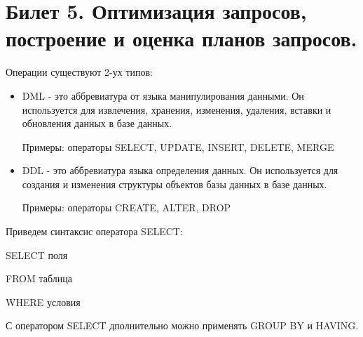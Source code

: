 \newpage
\section {Билет 5. Оптимизация запросов, построение и оценка планов запросов.}

Операции существуют 2-ух типов: 
\begin{itemize}
    \item DML - это аббревиатура от языка манипулирования данными. Он используется для извлечения, хранения, изменения, удаления, вставки и обновления данных в базе данных.

Примеры: операторы SELECT, UPDATE, INSERT, DELETE, MERGE

\item DDL - это аббревиатура языка определения данных. Он используется для создания и изменения структуры объектов базы данных в базе данных.

Примеры: операторы CREATE, ALTER, DROP
\end{itemize}

Приведем синтаксис оператора SELECT: 

SELECT поля

FROM таблица 

WHERE условия 

С оператором SELECT дполнительно можно применять GROUP BY и HAVING.  
\\[10pt]

